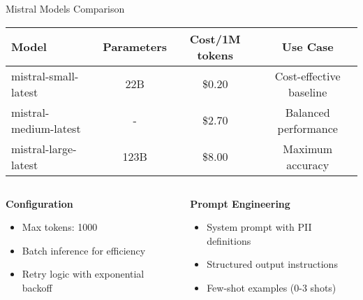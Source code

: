 \documentclass[aspectratio=169]{beamer}
\begin{document}
\begin{frame}{Mistral Models Comparison}
\begin{table}[h]
\centering
\begin{tabular}{lccc}
\toprule
\textbf{Model} & \textbf{Parameters} & \textbf{Cost/1M tokens} & \textbf{Use Case} \\
\midrule
mistral-small-latest & 22B & \$0.20 & Cost-effective baseline \\
mistral-medium-latest & - & \$2.70 & Balanced performance \\
mistral-large-latest & 123B & \$8.00 & Maximum accuracy \\
\bottomrule
\end{tabular}
\end{table}

\vspace{0.5cm}

\begin{columns}
\begin{column}{0.5\textwidth}
\textbf{Configuration}
\begin{itemize}
\item Max tokens: 1000
\item Batch inference for efficiency
\item Retry logic with exponential backoff
\end{itemize}
\end{column}
\begin{column}{0.5\textwidth}
\textbf{Prompt Engineering}
\begin{itemize}
\item System prompt with PII definitions
\item Structured output instructions
\item Few-shot examples (0-3 shots)
\end{itemize}
\end{column}
\end{columns}
\end{frame}
\end{document}
